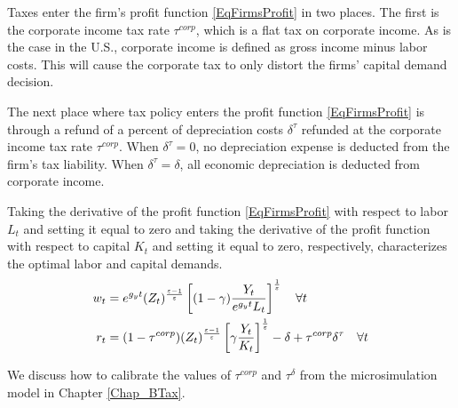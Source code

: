   Taxes enter the firm's profit function \eqref{EqFirmsProfit} in two places. The first is the corporate income tax rate $\tau^{corp}$, which is a flat tax on corporate income. As is the case in the U.S., corporate income is defined as gross income minus labor costs. This will cause the corporate tax to only distort the firms' capital demand decision.

  The next place where tax policy enters the profit function \eqref{EqFirmsProfit} is through a refund of a percent of depreciation costs $\delta^\tau$ refunded at the corporate income tax rate $\tau^{corp}$. When $\delta^\tau=0$, no depreciation expense is deducted from the firm's tax liability. When $\delta^\tau=\delta$, all economic depreciation is deducted from corporate income.

  Taking the derivative of the profit function \eqref{EqFirmsProfit} with respect to labor $L_t$ and setting it equal to zero and taking the derivative of the profit function with respect to capital $K_t$ and setting it equal to zero, respectively, characterizes the optimal labor and capital demands.
  \begin{align}
    w_t &= e^{g_y t}(Z_t)^\frac{\varepsilon-1}{\varepsilon}\left[(1-\gamma)\frac{Y_t}{e^{g_y t}L_t}\right]^\frac{1}{\varepsilon} \quad\forall t \label{EqFirmFOC_L} \\
    r_t &= (1 - \tau^{corp})(Z_t)^\frac{\varepsilon-1}{\varepsilon}\left[\gamma\frac{Y_t}{K_t}\right]^\frac{1}{\varepsilon} - \delta + \tau^{corp}\delta^\tau \quad\forall t \label{EqFirmFOC_K}
  \end{align}

  We discuss how to calibrate the values of $\tau^{corp}$ and $\tau^\delta$ from the \btax microsimulation model in Chapter \ref{Chap_BTax}.
